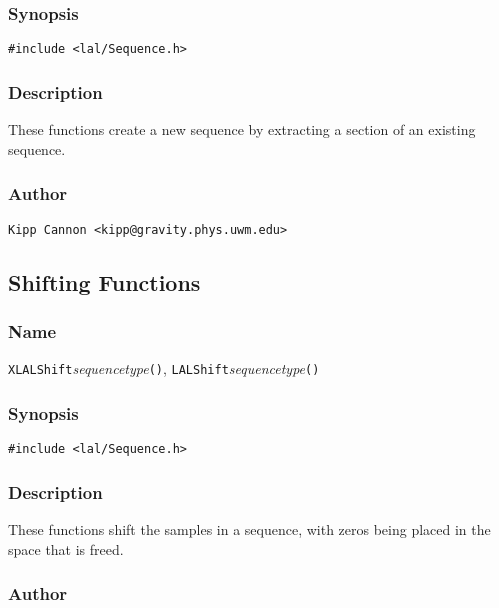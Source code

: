 \subsubsection{Synopsis}

\begin{verbatim}
#include <lal/Sequence.h>
\end{verbatim}


\subsubsection{Description}

These functions create a new sequence by extracting a section of an
existing sequence.

\subsubsection{Author}

\verb|Kipp Cannon <kipp@gravity.phys.uwm.edu>|


\subsection{Shifting Functions}

\subsubsection{Name}

\texttt{XLALShift}\textit{sequencetype}\texttt{()},
\texttt{LALShift}\textit{sequencetype}\texttt{()}

\subsubsection{Synopsis}

\begin{verbatim}
#include <lal/Sequence.h>
\end{verbatim}


\subsubsection{Description}

These functions shift the samples in a sequence, with zeros being placed in
the space that is freed.

\subsubsection{Author}

